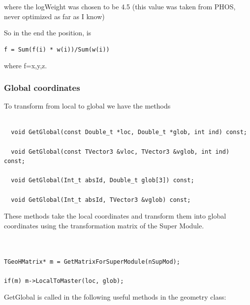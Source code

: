 where the logWeight was chosen to be 4.5 (this value was taken from PHOS, never optimized as far as I know)

So in the end the position,  is 

\begin{DDbox}{\linewidth}
\begin{lstlisting}
f = Sum(f(i) * w(i))/Sum(w(i))
\end{lstlisting}
\end{DDbox}

where f=x,y,z.

 

 \subsubsection{Global coordinates}
 

To transform from local to global we have the methods

\begin{DDbox}{\linewidth}
\begin{lstlisting}

  void GetGlobal(const Double_t *loc, Double_t *glob, int ind) const;

  void GetGlobal(const TVector3 &vloc, TVector3 &vglob, int ind) const;

  void GetGlobal(Int_t absId, Double_t glob[3]) const;

  void GetGlobal(Int_t absId, TVector3 &vglob) const;
\end{lstlisting}
\end{DDbox}

 

 These methods take the local coordinates and transform them into global coordinates using the transformation matrix of the Super Module.

\begin{DDbox}{\linewidth}
\begin{lstlisting}
 

TGeoHMatrix* m = GetMatrixForSuperModule(nSupMod);

if(m) m->LocalToMaster(loc, glob);

\end{lstlisting}
\end{DDbox}
 

 GetGlobal is called in the following useful methods in the geometry class:


